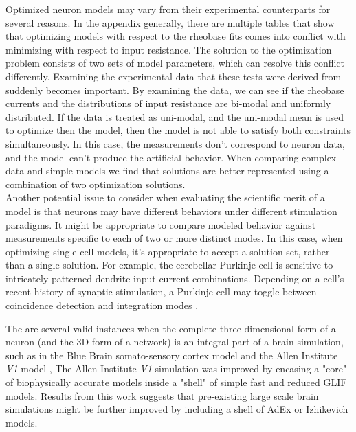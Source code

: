 

Optimized neuron models may vary from their experimental counterparts for several reasons. In the appendix generally, there are multiple tables that show that optimizing models with respect to the rheobase fits comes into conflict with minimizing with respect to input resistance. The solution to the optimization problem consists of two sets of model parameters, which can resolve this conflict differently. Examining the experimental data that these tests were derived from suddenly becomes important. By examining the data, we can see if the rheobase currents and the distributions of input resistance are bi-modal and uniformly distributed. If the data is treated as uni-modal, and the uni-modal mean is used to optimize then the model, then the model is not able to satisfy both constraints simultaneously. In this case, the measurements don’t correspond to neuron data, and the model can’t produce the artificial behavior. When comparing complex data and simple models we find that solutions are better represented using a combination of two optimization solutions.\\

Another potential issue to consider when evaluating the scientific merit of a model is that neurons may have different behaviors under different stimulation paradigms. It might be appropriate to compare modeled behavior against measurements specific to each of two or more distinct modes. In this case, when optimizing single cell models, it’s appropriate to accept a solution set, rather than a single solution. For example, the cerebellar Purkinje cell is sensitive to intricately patterned dendrite input current combinations. Depending on a cell’s recent history of synaptic stimulation, a Purkinje cell may toggle between coincidence detection and integration modes \cite{ratte2013impact}.

The are several valid instances when the complete three dimensional form of a neuron (and the 3D form of a network) is an integral part of a brain simulation, such as in the Blue Brain somato-sensory cortex model \cite{markram2006blue} and the Allen Institute \emph{V1} model \cite{billeh2020systematic}, The Allen Institute \emph{V1} simulation was improved by encasing a "core" of biophysically accurate models inside a "shell" of simple fast and reduced GLIF models. Results from this work suggests that pre-existing large scale brain simulations might be further improved by including a shell of AdEx or Izhikevich models.%

